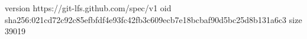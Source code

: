 version https://git-lfs.github.com/spec/v1
oid sha256:021cd72c92c85efbfdf4e93fc42fb3c609ecb7e18bcbaf90d5bc25d8b131a6c3
size 39019
